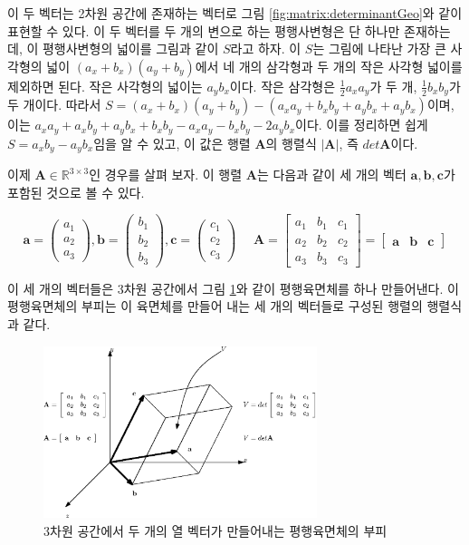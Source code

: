 이 두 벡터는 2차원 공간에 존재하는 벡터로 그림 \ref{fig:matrix:determinantGeo}와 같이 표현할 수 있다.
이 두 벡터를 두 개의 변으로 하는 평행사변형은 단 하나만 존재하는데, 이 평행사변형의 넓이를 그림과 같이 $S$라고 하자.
이 $S$는 그림에 나타난 가장 큰 사각형의 넓이 $(a_x+b_x)(a_y+b_y)$에서
네 개의 삼각형과 두 개의 작은 사각형 넓이를 제외하면 된다.
작은 사각형의 넓이는 $a_y b_x$이다.
작은 삼각형은 $\frac{1}{2} a_x a_y$가 두 개, $\frac{1}{2} b_x b_y$가 두 개이다.
따라서 $S = (a_x+b_x)(a_y+b_y) - ( a_x a_y  + b_x b_y +  a_y b_x + a_y b_x ) $이며,
이는 $ a_x a_y + a_x b_y + a_y b_x + b_x b_y -  a_x a_y  - b_x b_y - 2 a_y b_x  $이다.
이를 정리하면 쉽게 $S = a_x b_y - a_y b_x$임을 알 수 있고,
이 값은 행렬 $\mathbf A$의 행렬식 $|\mathbf A|$, 즉 $det \mathbf A$이다.


이제 $\mathbf A \in \mathbb R^{3 \times 3}$인 경우를 살펴 보자. 
이 행렬 $\mathbf A$는 다음과 같이 세 개의 벡터 $\mathbf a, \mathbf b, \mathbf c$가 포함된 것으로 볼 수 있다.

$$
\mathbf a = \left ( \begin{array}{c} a_1 \\ a_2 \\ a_3 \end{array} \right ) ,
\mathbf b = \left ( \begin{array}{c} b_1 \\ b_2 \\ b_3 \end{array} \right ) ,
\mathbf c = \left ( \begin{array}{c} c_1 \\ c_2 \\ c_3 \end{array} \right ) ~~~~~~
\mathbf A = \left [ \begin{array}{ccc}
a_1 & b_1 & c_1 \\
a_2 & b_2 & c_2 \\
a_3 & b_3 & c_3 
\end{array} \right ] =
\left [ \begin{array}{ccc}
\mathbf a & \mathbf b & \mathbf c
\end{array} \right ] 
$$

이 세 개의 벡터들은 3차원 공간에서 그림 \ref{fig:matrix:determinantGeo3D}와 같이 평행육면체를 하나 만들어낸다.
이 평행육면체의 부피는 이 육면체를 만들어 내는 세 개의 벡터들로 구성된 행렬의 행렬식과 같다.


\begin{figure}[h!]
  \centering
    \includegraphics[width=8cm]{Math_matrix/determinantGeo3D.eps}
    \caption{3차원 공간에서 두 개의 열 벡터가 만들어내는 평행육면체의 부피}
    \label{fig:matrix:determinantGeo3D}
\end{figure}

